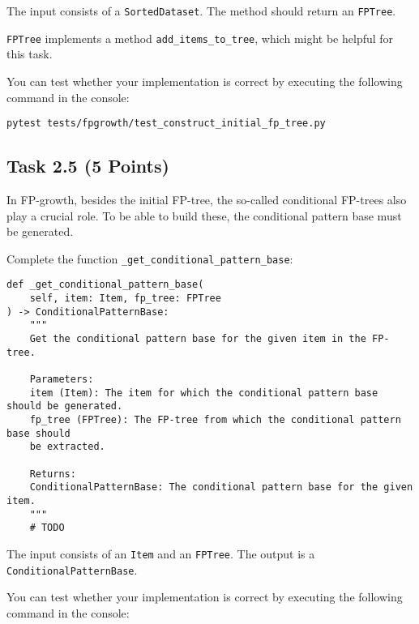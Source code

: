 \documentclass[
english,
smallborders
]{i6prcsht}
\newcommand{\points}[1]{\hfill \color{red}(#1 Points)\color{black}}
\begin{document}
\vspace*{0.1cm}

The input consists of a \texttt{SortedDataset}. The method should return an \texttt{FPTree}.

\texttt{FPTree} implements a method \texttt{add\_items\_to\_tree}, which might be helpful for this task.

You can test whether your implementation is correct by executing the following command in the console:

\vspace*{0.3cm}

\begin{lstlisting}
pytest tests/fpgrowth/test_construct_initial_fp_tree.py
\end{lstlisting}

\vspace*{0.1cm}

\subsection*{Task 2.5 \points{5}}

In FP-growth, besides the initial FP-tree, the so-called conditional FP-trees also play a crucial role. To be able to build these, the conditional pattern base must be generated.

Complete the function \texttt{\_get\_conditional\_pattern\_base}:

\vspace*{0.3cm}

\begin{lstlisting}
def _get_conditional_pattern_base(
 	self, item: Item, fp_tree: FPTree
) -> ConditionalPatternBase:
	"""
	Get the conditional pattern base for the given item in the FP-tree.

	Parameters:
	item (Item): The item for which the conditional pattern base should be generated.
	fp_tree (FPTree): The FP-tree from which the conditional pattern base should
	be extracted.

	Returns:
	ConditionalPatternBase: The conditional pattern base for the given item.
	"""
	# TODO
\end{lstlisting}

\vspace*{0.1cm}

The input consists of an \texttt{Item} and an \texttt{FPTree}. The output is a \texttt{ConditionalPatternBase}.

You can test whether your implementation is correct by executing the following command in the console:
\end{document}
